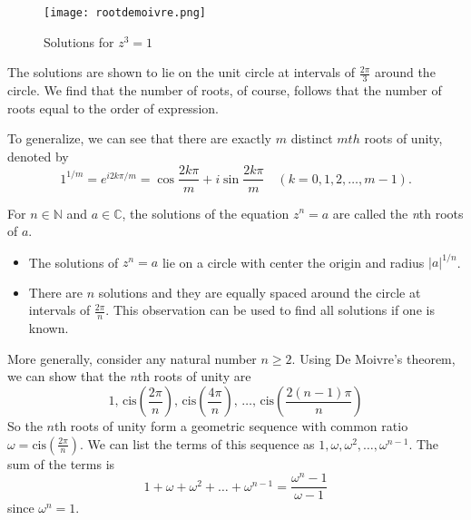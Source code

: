 \documentclass[
	12pt, %
	fleqn, %
	a4paper, %
]{LegrandOrangeBook}
\begin{document}
\begin{figure}[h]
    \centering
    \texttt{[image: rootdemoivre.png]}
    \caption{Solutions for $z^3=1$}
\end{figure}
The solutions are shown to lie on the unit circle at intervals of \( \frac{2\pi}{3} \) around the circle.
We find that the number of roots, of course, follows that the number of roots equal to the order of expression.

To generalize, we can see that there are exactly $m$ distinct $mth$ roots of unity, denoted
by
 \begin{equation}
    \boxed{1^{1/m}=e^{i2k\pi/m}=\cos\frac{2k\pi}m+i\sin\frac{2k\pi}m\quad(k=0,1,2, \ldots, m-1).}
 \end{equation}

\begin{theorem}[Solution of \( z^n = a \)] 

    For \( n \in \mathbb{N} \) and \( a \in \mathbb{C} \), the solutions of the equation \( z^n = a \) are called the \textit{n}th roots of \( a \).
\begin{itemize}[leftmargin=*]
    \item The solutions of \( z^n = a \) lie on a circle with center the origin and radius \( |a|^{1/n} \).
    \item There are \( n \) solutions and they are equally spaced around the circle at intervals of \( \frac{2\pi}{n} \). This observation can be used to find all solutions if one is known.
\end{itemize}
\end{theorem}   
More generally, consider any natural number \( n \geq 2 \). Using De Moivre's theorem, we can show that the \( n \)th roots of unity are
\[
1, \, \text{cis}\left(\frac{2\pi}{n}\right), \, \text{cis}\left(\frac{4\pi}{n}\right), \, \ldots, \, \text{cis}\left(\frac{2(n-1)\pi}{n}\right)
\]
So the \( n \)th roots of unity form a geometric sequence with common ratio \( \omega = \text{cis}\left(\frac{2\pi}{n}\right) \).
We can list the terms of this sequence as \( 1, \omega, \omega^2, \ldots, \omega^{n-1} \). The sum of the terms is
\[
1 + \omega + \omega^2 + \ldots + \omega^{n-1} = \frac{\omega^n - 1}{\omega - 1}
\]
since \( \omega^n = 1 \).
\end{document}
